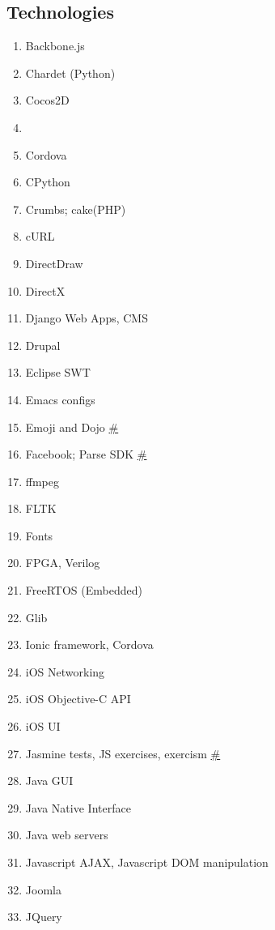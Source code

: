 \documentclass[conference,10pt]{IEEEtran}
\begin{document}
 \begin{figure}[H]
 \subsection{Technologies}
 \begin{multicols}{2}
 \begin{enumerate}
    \setcounter{enumi}{\value{topics}}
    \item Backbone.js
    \item Chardet (Python)
    \item Cocos2D
    \item {}
    \item Cordova
    \item CPython
    \item Crumbs; cake(PHP)
    \item cURL
    \item DirectDraw
    \item DirectX
    \item Django Web Apps, CMS
    \item Drupal
    \item Eclipse SWT
    \item Emacs configs
    \item Emoji and Dojo \hyperref[dual]{\#}
    \item Facebook; Parse SDK \hyperref[dual]{\#}
    \item ffmpeg
    \item FLTK
    \item Fonts
    \item FPGA, Verilog
    \item FreeRTOS (Embedded)
    \item Glib
    \item Ionic framework, Cordova
    \item iOS Networking
    \item iOS Objective-C API
    \item iOS UI
    \item Jasmine tests, JS exercises, exercism \hyperref[dual]{\#}
    \item Java GUI
    \item Java Native Interface
    \item Java web servers
    \item Javascript AJAX, Javascript DOM manipulation
    \item Joomla
    \item JQuery

\end{enumerate}
\end{multicols}
\end{figure}
\end{document}
